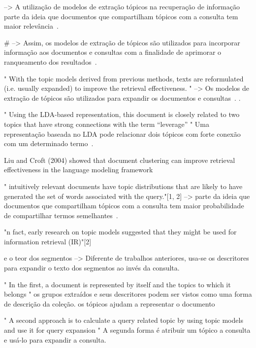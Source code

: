 --> A utilização de modelos de extração tópicos na recuperação de informação parte da ideia que documentos que compartilham tópicos com a consulta tem maior relevância~\cite{Xing2009}. 

# --> Assim, os modelos de extração de tópicos são utilizados para incorporar informação aos documentos e consultas com a finalidade de aprimorar o ranqueamento dos resultados~\cite{WEI2007}.


" With the topic models derived from previous methods, texts are reformulated (i.e. usually expanded) to improve the retrieval effectiveness. "  
--> Os modelos de extração de tópicos são utilizados para expandir os documentos e consultas~\cite{WEI2007}.
.



" Using the LDA-based representation, this document is closely related to two topics that have strong connections with the term “leverage” "
Uma representação baseada no LDA pode relacionar dois tópicos com forte conexão com um determinado termo~\cite{Wei2006}.




Liu and Croft (2004) showed that document clustering can improve retrieval effectiveness in the language modeling framework


" intuitively relevant documents have topic distributions that are likely to have generated the set of words associated with the query."[1, 2]
--> { parte da ideia que documentos que compartilham tópicos com  a consulta tem maior probabilidade de compartilhar termos semelhantes~\cite{Xing2009}. } 

"n fact, early research on topic models suggested that they might be used for information retrieval (IR)"[2]





e o teor dos segmentos
--> { Diferente de trabalhos anteriores, usa-se os descritores para expandir o texto dos segmentos ao invés da consulta. }

" In the first, a document is represented by itself and the topics to which it belongs "
os grupos extraídos e seus descritores podem ser vistos como uma forma de descrição da coleção.
os tópicos ajudam a representar o documento

" A second approach is to calculate a query related topic by using topic models and use it for query expansion "
A segunda forma é atribuir um tópico a consulta e usá-lo para expandir a consulta.
~\cite{Xing2009}

